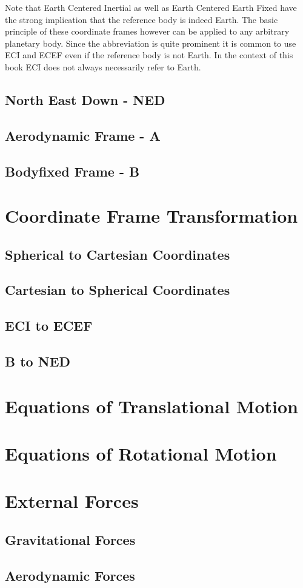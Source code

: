 \begin{kaobox}[frametitle=Reference Body]
	Note that Earth Centered Inertial as well as Earth Centered Earth Fixed have the strong implication that the reference body is indeed Earth. The basic principle of these coordinate frames however can be applied to any arbitrary planetary body. Since the abbreviation is quite prominent it is common to use ECI and ECEF even if the reference body is not Earth. In the context of this book ECI does not always necessarily refer to Earth.
\end{kaobox}

\subsection{North East Down - NED}
\subsection{Aerodynamic Frame - A}
\subsection{Bodyfixed Frame - B}

\section{Coordinate Frame Transformation}
	\subsection{Spherical to Cartesian Coordinates}
	\subsection{Cartesian to Spherical Coordinates}
	\subsection{ECI to ECEF}
	\subsection{B to NED}
	
	
\section{Equations of Translational Motion}

\section{Equations of Rotational Motion}

\section{External Forces}
	\subsection{Gravitational Forces}
	\subsection{Aerodynamic Forces}
